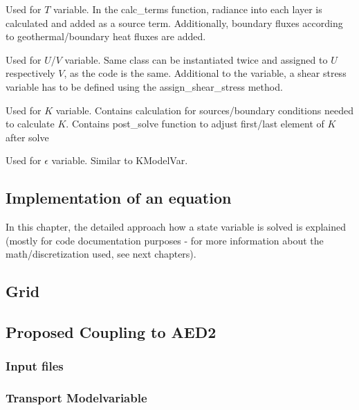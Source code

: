 \documentclass[paper=a4, fontsize=12pt]{article}
\begin{document}
\begin{description}[style=nextline]
\begin{description}[style=multiline, leftmargin=17em]
		\item[TempModelVar] Used for $T$ variable. In the calc\_terms function, radiance into each layer is calculated and added as a source term. Additionally, boundary fluxes according to geothermal/boundary heat fluxes are added.
		
		\item[UVModelVar] Used for $U$/$V$ variable. Same class can be instantiated twice and assigned to $U$ respectively $V$, as the code is the same. Additional to the variable, a shear stress variable has to be defined using the assign\_shear\_stress method.
		
		\item[KModelVar] Used for $K$ variable. Contains calculation for sources/boundary conditions needed to calculate $K$. Contains post\_solve function to adjust first/last element of $K$ after solve

		\item[EpsModelVar] Used for $\epsilon$ variable. Similar to KModelVar.
\end{description}
\end{description}



\subsection{Implementation of an equation}
In this chapter, the detailed approach how a state variable is solved is explained (mostly for code documentation purposes - for more information about the math/discretization used, see next chapters).

\subsection{Grid}

\subsection{Proposed Coupling to AED2}

\subsubsection{Input files}

\subsubsection{Transport Modelvariable}
\end{document}
